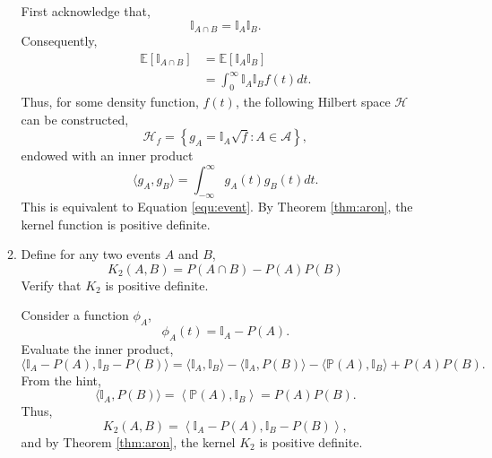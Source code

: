 \documentclass{article}[12pt]
\begin{document}
\begin{enumerate}
\begin{enumerate}
First acknowledge that,
\begin{equation}
\mathbb I _{A \cap B} = \mathbb{I}_A \mathbb{I}_B.
\end{equation}
Consequently, 
\begin{equation}\label{equ:event}
\begin{aligned} 
\mathbb E \left[ \mathbb I_{A \cap B} \right] &= \mathbb E \left[ \mathbb I_{A} \mathbb I_{B} \right]\\
&= \int_0^\infty \mathbb I_{A} \mathbb I_{B} f(t)
 dt. \end{aligned}
\end{equation}
Thus, for some density function, $f(t)$, the following Hilbert space $\mathcal H$ can be constructed,
\begin{equation}
\mathcal H_f = \left\{g_A = \mathbb I_A \sqrt{f} : A \in \mathcal A \right\},
\end{equation}
endowed with an inner product
\begin{equation}
\langle g_A, g_B\rangle = \int_{-\infty}^{\infty} g_A(t) g_B (t) dt.
\end{equation}
This is equivalent to Equation \ref{equ:event}. By Theorem \ref{thm:aron}, the kernel function is positive definite.


\item Define for any two events $A$ and $B$, 
$$K_2(A,B)=P(A \cap B)-P(A)P(B)$$
Verify that $K_2$ is positive definite. 

Consider a function $\phi_A$,
\begin{equation}
\phi_A (t) =  \mathbb I_A - P(A).
\end{equation}
Evaluate the inner product,
\begin{equation}
\langle \mathbb{I}_{A}-P(A), \mathbb{I}_{B}-P(B) \rangle = \langle \mathbb{I}_{A}, \mathbb{I}_{B} \rangle -  \langle \mathbb{I}_{A}, P(B) \rangle -  \langle \mathbb P(A), \mathbb{I}_{B} \rangle +  P(A) P(B).
\end{equation}
From the hint,
\begin{equation}
\langle \mathbb{I}_{A}, P(B) \rangle =\left\langle\mathbb{P}(A), \mathbb{I}_{B}\right\rangle=  P(A) P(B).
\end{equation}
Thus,
\begin{equation}
K_2(A, B) = \left\langle\mathbb{I}_{A}-P(A), \mathbb{I}_{B}-P(B)\right\rangle,
\end{equation}
and by Theorem \ref{thm:aron}, the kernel $K_2$ is positive definite.

\end{enumerate}
\end{enumerate}
\end{document}
